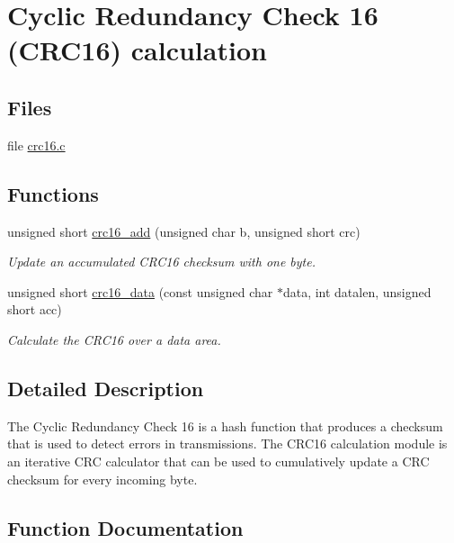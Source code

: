 \hypertarget{group__crc16}{}\section{Cyclic Redundancy Check 16 (C\+R\+C16) calculation}
\label{group__crc16}
\subsection*{Files}
\begin{DoxyCompactItemize}
\item 
file \hyperlink{crc16_8c}{crc16.\+c}
\end{DoxyCompactItemize}
\subsection*{Functions}
\begin{DoxyCompactItemize}
\item 
unsigned short \hyperlink{group__crc16_ga1c898c9701c991daef7514d2ad88669a}{crc16\+\_\+add} (unsigned char b, unsigned short crc)
\begin{DoxyCompactList}\small\item\em Update an accumulated C\+R\+C16 checksum with one byte. \end{DoxyCompactList}\item 
unsigned short \hyperlink{group__crc16_ga7feada5644b9a99215dcb4fa9c5bc7c0}{crc16\+\_\+data} (const unsigned char $\ast$data, int datalen, unsigned short acc)
\begin{DoxyCompactList}\small\item\em Calculate the C\+R\+C16 over a data area. \end{DoxyCompactList}\end{DoxyCompactItemize}


\subsection{Detailed Description}
The Cyclic Redundancy Check 16 is a hash function that produces a checksum that is used to detect errors in transmissions. The C\+R\+C16 calculation module is an iterative C\+R\+C calculator that can be used to cumulatively update a C\+R\+C checksum for every incoming byte. 

\subsection{Function Documentation}
\hypertarget{group__crc16_ga1c898c9701c991daef7514d2ad88669a}{}
